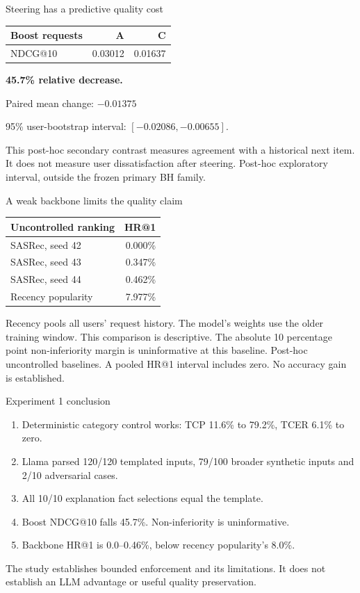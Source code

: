 \documentclass[10pt]{beamer}
\newcommand{\toprule}{\hline}
\newcommand{\midrule}{\hline}
\newcommand{\bottomrule}{\hline}
\newcommand{\src}[1]{\vfill{\tiny\color{bcitgray}#1}}
\begin{document}
\begin{frame}{Steering has a predictive quality cost}
\begin{tabular}{@{}lrr@{}}
\toprule
Boost requests & A & C\\\midrule
NDCG@10 & 0.03012 & 0.01637\\\bottomrule
\end{tabular}\par
\vspace{0.35cm}
\textbf{45.7\% relative decrease.}
\vspace{0.3cm}

Paired mean change: $-0.01375$\par
95\% user-bootstrap interval: $[-0.02086,-0.00655]$.
\vspace{0.3cm}

This post-hoc secondary contrast measures agreement with a historical next item. It does not measure user dissatisfaction after steering.
\src{Post-hoc exploratory interval, outside the frozen primary BH family.}
\end{frame}

\begin{frame}{A weak backbone limits the quality claim}
\begin{tabular}{@{}lr@{}}
\toprule
Uncontrolled ranking & HR@1\\\midrule
SASRec, seed 42 & 0.000\%\\
SASRec, seed 43 & 0.347\%\\
SASRec, seed 44 & 0.462\%\\
Recency popularity & 7.977\%\\\bottomrule
\end{tabular}\par
\vspace{0.3cm}
Recency pools all users' request history. The model's weights use the older training window. This comparison is descriptive.
\vspace{0.2cm}
The absolute 10 percentage point non-inferiority margin is uninformative at this baseline.
\src{Post-hoc uncontrolled baselines. A pooled HR@1 interval includes zero. No accuracy gain is established.}
\end{frame}

\begin{frame}{Experiment 1 conclusion}
\begin{enumerate}
\item Deterministic category control works: TCP 11.6\% to 79.2\%, TCER 6.1\% to zero.
\item Llama parsed 120/120 templated inputs, 79/100 broader synthetic inputs and 2/10 adversarial cases.
\item All 10/10 explanation fact selections equal the template.
\item Boost NDCG@10 falls 45.7\%. Non-inferiority is uninformative.
\item Backbone HR@1 is 0.0--0.46\%, below recency popularity's 8.0\%.
\end{enumerate}
\src{The study establishes bounded enforcement and its limitations. It does not establish an LLM advantage or useful quality preservation.}
\end{frame}
\end{document}
